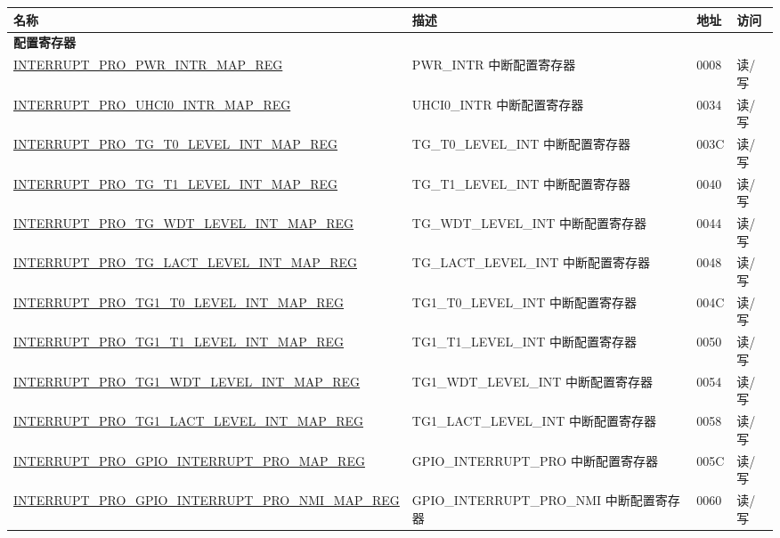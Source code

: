 
\begin{longtable}{ | m{9.3cm} | m{9.2cm} | m{1.3cm} | m{1.2cm} | }
\hline\rowcolor{lightgray}
名称 & 描述 &  地址 & 访问 \\ \hline
\endhead
\multicolumn{4}{|l|}{\textbf{配置寄存器}} \\ \hline
\hyperref[regdesc:INTERRUPTPROPWRINTRMAPREG]{INTERRUPT\_PRO\_PWR\_INTR\_MAP\_REG} & PWR\_INTR 中断配置寄存器 & \hexprefix{}0008 &读/写 \\ \hline
\hyperref[regdesc:INTERRUPTPROUHCI0INTRMAPREG]{INTERRUPT\_PRO\_UHCI0\_INTR\_MAP\_REG} & UHCI0\_INTR 中断配置寄存器 & \hexprefix{}0034 &读/写 \\ \hline
\hyperref[regdesc:INTERRUPTPROTGT0LEVELINTMAPREG]{INTERRUPT\_PRO\_TG\_T0\_LEVEL\_INT\_MAP\_REG} & TG\_T0\_LEVEL\_INT 中断配置寄存器 & \hexprefix{}003C &读/写 \\ \hline
\hyperref[regdesc:INTERRUPTPROTGT1LEVELINTMAPREG]{INTERRUPT\_PRO\_TG\_T1\_LEVEL\_INT\_MAP\_REG} & TG\_T1\_LEVEL\_INT 中断配置寄存器 & \hexprefix{}0040 &读/写 \\ \hline
\hyperref[regdesc:INTERRUPTPROTGWDTLEVELINTMAPREG]{INTERRUPT\_PRO\_TG\_WDT\_LEVEL\_INT\_MAP\_REG} & TG\_WDT\_LEVEL\_INT 中断配置寄存器 & \hexprefix{}0044 &读/写 \\ \hline
\hyperref[regdesc:INTERRUPTPROTGLACTLEVELINTMAPREG]{INTERRUPT\_PRO\_TG\_LACT\_LEVEL\_INT\_MAP\_REG} & TG\_LACT\_LEVEL\_INT 中断配置寄存器 & \hexprefix{}0048 &读/写 \\ \hline
\hyperref[regdesc:INTERRUPTPROTG1T0LEVELINTMAPREG]{INTERRUPT\_PRO\_TG1\_T0\_LEVEL\_INT\_MAP\_REG} & TG1\_T0\_LEVEL\_INT 中断配置寄存器 & \hexprefix{}004C &读/写 \\ \hline
\hyperref[regdesc:INTERRUPTPROTG1T1LEVELINTMAPREG]{INTERRUPT\_PRO\_TG1\_T1\_LEVEL\_INT\_MAP\_REG} & TG1\_T1\_LEVEL\_INT 中断配置寄存器 & \hexprefix{}0050 &读/写 \\ \hline
\hyperref[regdesc:INTERRUPTPROTG1WDTLEVELINTMAPREG]{INTERRUPT\_PRO\_TG1\_WDT\_LEVEL\_INT\_MAP\_REG} & TG1\_WDT\_LEVEL\_INT 中断配置寄存器 & \hexprefix{}0054 &读/写 \\ \hline
\hyperref[regdesc:INTERRUPTPROTG1LACTLEVELINTMAPREG]{INTERRUPT\_PRO\_TG1\_LACT\_LEVEL\_INT\_MAP\_REG} & TG1\_LACT\_LEVEL\_INT 中断配置寄存器 & \hexprefix{}0058 &读/写 \\ \hline
\hyperref[regdesc:INTERRUPTPROGPIOINTERRUPTPROMAPREG]{INTERRUPT\_PRO\_GPIO\_INTERRUPT\_PRO\_MAP\_REG} & GPIO\_INTERRUPT\_PRO 中断配置寄存器 & \hexprefix{}005C &读/写 \\ \hline
\hyperref[regdesc:INTERRUPTPROGPIOINTERRUPTPRONMIMAPREG]{INTERRUPT\_PRO\_GPIO\_INTERRUPT\_PRO\_NMI\_MAP\_REG} & GPIO\_INTERRUPT\_PRO\_NMI 中断配置寄存器 & \hexprefix{}0060 &读/写 \\ \hline

\end{longtable}
